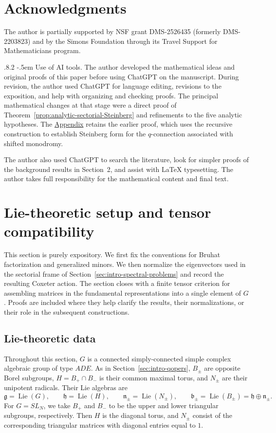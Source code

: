 \documentclass[11pt,leqno]{amsart}
\makeatletter
\numberwithin{equation}{section}
\renewcommand\paragraph{\@startsection{paragraph}{4}{\z@}%
  {.8\baselineskip \@plus .2\baselineskip}%
  {-.5em}%
  {\normalfont\normalsize\bfseries}}
\theoremstyle{plain}
\theoremstyle{definition}
\theoremstyle{plain}
\theoremstyle{definition}
\theoremstyle{remark}
\newcommand{\g}{\mathfrak g}
\newcommand{\gh}{\mathfrak h}
\newcommand{\n}{\mathfrak n}
\makeatother
\begin{document}
\section*{Acknowledgments}

The author is partially supported by NSF grant DMS-2526435 (formerly DMS-2203823) and by the Simons Foundation through its Travel Support for Mathematicians program.

\paragraph{Use of AI tools.}
The author developed the mathematical ideas and original proofs of this paper before using ChatGPT on the manuscript. During revision, the author used ChatGPT for language editing, revisions to the exposition, and help with organizing and checking proofs. The principal mathematical changes at that stage were a direct proof of Theorem~\ref{prop:analytic-sectorial-Steinberg} and refinements to the five analytic hypotheses. The \hyperref[sec:opposite-normal-form]{Appendix} retains the earlier proof, which uses the recursive construction to establish Steinberg form for the $q$-connection associated with shifted monodromy.

The author also used ChatGPT to search the literature, look for simpler proofs of the background results in Section~2, and assist with \LaTeX{} typesetting. The author takes full responsibility for the mathematical content and final text.

\section{Lie-theoretic setup and tensor compatibility}

This section is purely expository.  We first fix the conventions for Bruhat factorization and generalized minors.  We then normalize the eigenvectors used in the sectorial frame of Section~\ref{sec:intro-spectral-problems} and record the resulting Coxeter action.  The section closes with a finite tensor criterion for assembling matrices in the fundamental representations into a single element of $G$.  Proofs are included where they help clarify the results, their normalizations, or their role in the subsequent constructions.

\subsection{Lie-theoretic data}\label{sec:lie-theoretic-data}
Throughout this section, $G$ is a connected simply-connected simple complex algebraic group of type $ADE$.  As in Section~\ref{sec:intro-qopers}, $B_\pm$ are opposite Borel subgroups, $H=B_+\cap B_-$ is their common maximal torus, and $N_\pm$ are their unipotent radicals.  Their Lie algebras are
\[
 \g=\operatorname{Lie}(G),\qquad
 \gh=\operatorname{Lie}(H),\qquad
 \n_\pm=\operatorname{Lie}(N_\pm),\qquad
 \mathfrak b_\pm=\operatorname{Lie}(B_\pm)=\gh\oplus\n_\pm.
\]  For $G=SL_N$, we take $B_+$ and $B_-$ to be the upper and lower triangular subgroups, respectively.  Then $H$ is the diagonal torus, and $N_\pm$ consist of the corresponding triangular matrices with diagonal entries equal to $1$.
\end{document}
